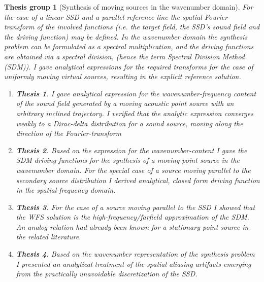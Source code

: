 \documentclass[10pt,twoside]{article}
\theoremstyle{thesisgroupstyle}
\newtheorem{thesisgroup}{Thesis group}
\newtheorem{thesis}{Thesis}[thesisgroup]
\begin{document}
\begin{thesisgroup}[Synthesis of moving sources in the wavenumber domain]
For the case of a linear SSD and a parallel reference line the spatial Fourier-transform of the involved functions (i.e. the target field, the SSD's sound field and the driving function) may be defined.
In the wavenumber domain the synthesis problem can be formulated as a spectral multiplication, and the driving functions are obtained via a spectral division, (hence the term \emph{Spectral Division Method (SDM)}).
I gave analytical expressions for the required transforms for the case of uniformly moving virtual sources, resulting in the explicit reference solution.
	\begin{enumerate}
	\item[] \vspace{-7mm}\begin{thesis} I gave analytical expression for the wavenumber-frequency content of the sound field generated by a moving acoustic point source with an arbitrary inclined trajectory.
	I verified that the analytic expression converges weakly to a Dirac-delta distribution for a sound source, moving along the direction of the Fourier-transform \end{thesis}
	\item[] \vspace{-7mm}\begin{thesis} Based on the expression for the wavenumber-content I gave the SDM driving functions for the synthesis of a moving point source in the wavenumber domain.
	For the special case of a source moving parallel to the secondary source distribution I derived analytical, closed form driving function in the spatial-frequency domain.\end{thesis}
	\item[] \vspace{-7mm}\begin{thesis} For the case of a source moving parallel to the SSD I showed that the WFS solution is the high-frequency/farfield approximation of the SDM. An analog relation had already been known for a stationary point source in the related literature.\end{thesis}
	\item[] \vspace{-7mm}\begin{thesis} Based on the wavenumber representation of the synthesis problem I presented an analytical treatment of the spatial aliasing artifacts emerging from the practically unavoidable discretization of the SSD.

\end{thesis}
\end{enumerate}
\end{thesisgroup}
\end{document}
